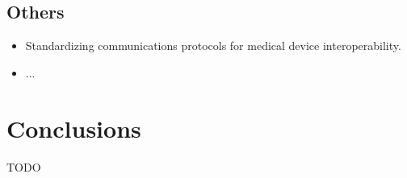 \documentclass{article}
\begin{document}
\subsection{Others}
\begin{itemize}
    \item Standardizing communications protocols for medical device interoperability. 
    \item ...
\end{itemize}



\section{Conclusions}
TODO




% 

\end{document}
